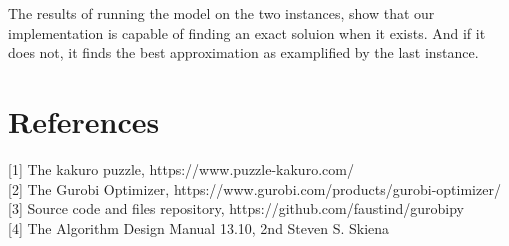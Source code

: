 \documentclass[11pt]{article}
\begin{document}
    The results of running the model on the two instances, show that our
implementation is capable of finding an exact soluion when it exists.
And if it does not, it finds the best approximation as examplified by
the last instance.

    \section{References}\label{references}

{[}1{]} The kakuro puzzle, https://www.puzzle-kakuro.com/\\
{[}2{]} The Gurobi Optimizer,
https://www.gurobi.com/products/gurobi-optimizer/\\
{[}3{]} Source code and files repository,
https://github.com/faustind/gurobipy\\
{[}4{]} The Algorithm Design Manual 13.10, 2nd Steven S. Skiena


    
    
    
\end{document}

